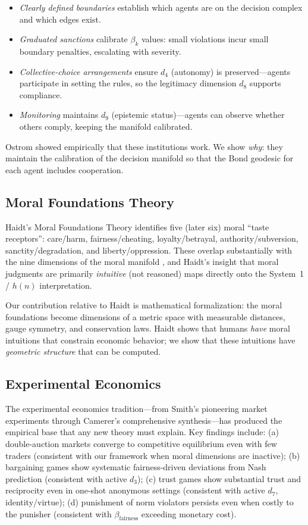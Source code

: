\documentclass[12pt]{article}
\theoremstyle{definition}
\theoremstyle{remark}
\begin{document}
\begin{itemize}
    \item \emph{Clearly defined boundaries} establish which agents are on the decision complex and which edges exist.
    \item \emph{Graduated sanctions} calibrate $\beta_k$ values: small violations incur small boundary penalties, escalating with severity.
    \item \emph{Collective-choice arrangements} ensure $d_4$ (autonomy) is preserved---agents participate in setting the rules, so the legitimacy dimension $d_8$ supports compliance.
    \item \emph{Monitoring} maintains $d_9$ (epistemic status)---agents can observe whether others comply, keeping the manifold calibrated.
\end{itemize}

Ostrom showed empirically that these institutions work.  We show \emph{why}: they maintain the calibration of the decision manifold so that the Bond geodesic for each agent includes cooperation.

\subsection{Moral Foundations Theory}

Haidt's Moral Foundations Theory \cite{haidt2012} identifies five (later six) moral ``taste receptors'': care/harm, fairness/cheating, loyalty/betrayal, authority/subversion, sanctity/degradation, and liberty/oppression.  These overlap substantially with the nine dimensions of the moral manifold \cite{bond2026geometric}, and Haidt's insight that moral judgments are primarily \emph{intuitive} (not reasoned) maps directly onto the System~1 / $h(n)$ interpretation.

Our contribution relative to Haidt is mathematical formalization: the moral foundations become dimensions of a metric space with measurable distances, gauge symmetry, and conservation laws.  Haidt shows that humans \emph{have} moral intuitions that constrain economic behavior; we show that these intuitions have \emph{geometric structure} that can be computed.

\subsection{Experimental Economics}

The experimental economics tradition---from Smith's \cite{smith1962} pioneering market experiments through Camerer's \cite{camerer2003} comprehensive synthesis---has produced the empirical base that any new theory must explain.  Key findings include: (a) double-auction markets converge to competitive equilibrium even with few traders (consistent with our framework when moral dimensions are inactive); (b) bargaining games show systematic fairness-driven deviations from Nash prediction (consistent with active $d_3$); (c) trust games show substantial trust and reciprocity even in one-shot anonymous settings (consistent with active $d_7$, identity/virtue); (d) punishment of norm violators persists even when costly to the punisher (consistent with $\beta_{\text{fairness}}$ exceeding monetary cost).
\end{document}
